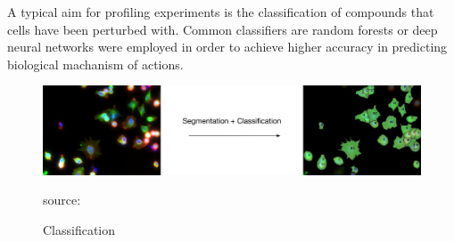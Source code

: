 A typical aim for profiling experiments is the classification of compounds that cells have been perturbed with. Common classifiers are random forests or deep neural networks were employed in order to achieve higher accuracy in predicting biological machanism of actions.


\begin{figure}[H]
	\centering
	\includegraphics[width=0.8\linewidth]{bilder/cells/classification.png}
	\caption{Classification}
	source:\cite{Component}
	\label{fig:COMPONENT}
\end{figure}




